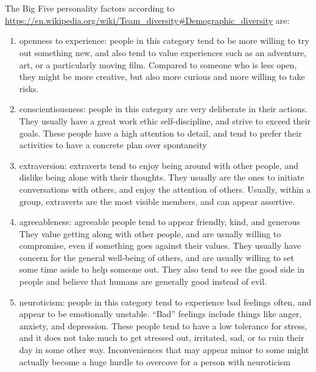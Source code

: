 \documentclass[letterpaper,12pt]{article}
\begin{document}
\section{}
The Big Five personality factors according to \url{https://en.wikipedia.org/wiki/Team_diversity#Demographic_diversity} are:
\begin{enumerate}
  \item openness to experience: people in this category tend to be more willing to try out something new, and also tend to
        value experiences such as an adventure, art, or a particularly moving film. Compared to someone who is less open, they
        might be more creative, but also more curious and more willing to take risks.
  \item conscientiousness: people in this category are very deliberate in their actions. They usually have a great work ethic
        self-discipline, and strive to exceed their goals. These people have a high attention to detail, and tend to prefer their activities to have a concrete plan over spontaneity
  \item extraversion: extraverts tend to enjoy being around with other people, and dislike being alone with their thoughts. They usually are the ones to initiate conversations with others, and enjoy the attention of others. Usually, within a group,
        extraverts are the most visible members, and can appear assertive.
  \item agreeableness:  agreeable people tend to appear friendly, kind, and generous They value getting along with other people, and are usually willing to compromise, even if something goes against their values. They usually have concern for the general
        well-being of others, and are usually willing to set some time aside to help someone out. They also tend to see the good side in people and believe that humans are generally good instead of evil.
  \item neuroticism: people in this category tend to experience bad feelings often, and appear to be emotionally unstable. ``Bad'' feelings include things like anger, anxiety, and depression. These people tend to have a low tolerance for stress, and it does
        not take much to get stressed out, irritated, sad, or to ruin their day in some other way. Inconveniences that may appear minor to some might actually become a huge hurdle to overcove for a person with neuroticism
\end{enumerate}
\end{document}
